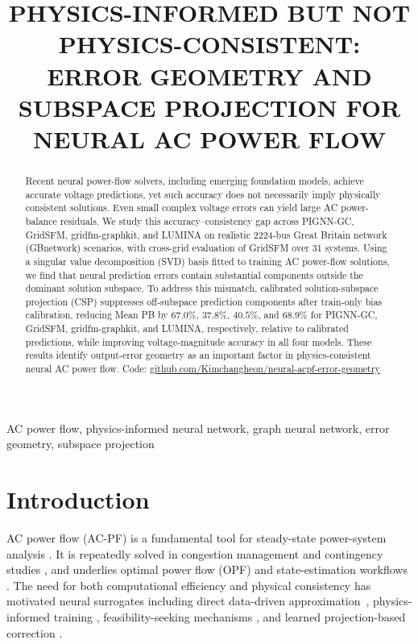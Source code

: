 \documentclass{article}
\title{PHYSICS-INFORMED BUT NOT PHYSICS-CONSISTENT:\\
ERROR GEOMETRY AND SUBSPACE PROJECTION FOR NEURAL AC POWER FLOW}
\begin{document}
\ninept
\maketitle

\begin{abstract}
Recent neural power-flow solvers, including emerging foundation models,
achieve accurate voltage predictions, yet such accuracy does not
necessarily imply physically consistent solutions.
Even small complex voltage errors can yield large AC power-balance residuals.
We study this accuracy--consistency gap across PIGNN-GC, GridSFM,
gridfm-graphkit, and LUMINA on realistic 2224-bus Great Britain network (GBnetwork) scenarios,
with cross-grid evaluation of GridSFM over 31 systems.
Using a singular value decomposition (SVD) basis fitted to training AC power-flow solutions, we find
that neural prediction errors contain substantial components outside the
dominant solution subspace. To address this mismatch, calibrated
solution-subspace projection (CSP) suppresses off-subspace prediction
components after train-only bias calibration, reducing Mean PB by $67.0\%$, $37.8\%$, $40.5\%$, and $68.9\%$
for PIGNN-GC, GridSFM, gridfm-graphkit, and LUMINA, respectively,
relative to calibrated predictions, while improving voltage-magnitude
accuracy in all four models.
These results identify output-error geometry as an important factor in
physics-consistent neural AC power flow.
Code: \href{http://github.com/Kimchangheon/neural-acpf-error-geometry}{github.com/Kimchangheon/neural-acpf-error-geometry}
\end{abstract}


\begin{keywords}
AC power flow, physics-informed neural network, graph neural network, error geometry, subspace projection
\end{keywords}

\section{Introduction}
\label{sec:introduction}

AC power flow (AC-PF) is a fundamental tool for steady-state power-system
analysis \cite{zimmerman2011matpower}. It is repeatedly solved in congestion
management \cite{conrad2026congestion} and contingency studies
\cite{bolz2023contingency}, and underlies optimal power flow (OPF)
\cite{frank2012opf,owerko2020opf} and state-estimation workflows
\cite{cheng2024stateestimation}.
The need for both computational efficiency and physical consistency has
motivated neural surrogates including direct data-driven approximation~\cite{donon2020graphsolver,lin2024powerflownet}, physics-informed training \cite{owerko2024unsupervised,jiang2025upinn,wen2026pigat}, feasibility-seeking mechanisms \cite{nguyen2025fsnet,donti2021dc3}, and learned projection-based correction \cite{chzhen2026fab}.
\end{document}
